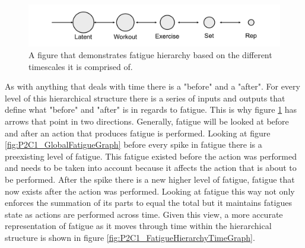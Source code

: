 \begin{figure}[htb]
    \centering
    \includegraphics[scale=0.55]{images/p2/ch1/FatigueHierarchy.png}
    \caption{A figure that demonstrates fatigue hierarchy based on the different timescales it is comprised of.}
    \label{fig:P2C1_FatigueHierarchyGraph}
\end{figure}

As with anything that deals with time there is a "before" and a "after". For every level of this hierarchical structure there is a series of inputs and outputs that define what "before" and "after" is in regards to fatigue. This is why figure \ref{fig:P2C1_FatigueHierarchyGraph} has arrows that point in two directions. Generally, fatigue will be looked at before and after an action that produces fatigue is performed. Looking at figure \ref{fig:P2C1_GlobalFatigueGraph} before every spike in fatigue there is a preexisting level of fatigue. This fatigue existed before the action was performed and needs to be taken into account because it affects the action that is about to be performed. After the spike there is a new higher level of fatigue, fatigue that now exists after the action was performed. Looking at fatigue this way not only enforces the summation of its parts to equal the total but it maintains fatigues state as actions are performed across time. Given this view, a more accurate representation of fatigue as it moves through time within the hierarchical structure is shown in figure \ref{fig:P2C1_FatigueHierarchyTimeGraph}.

